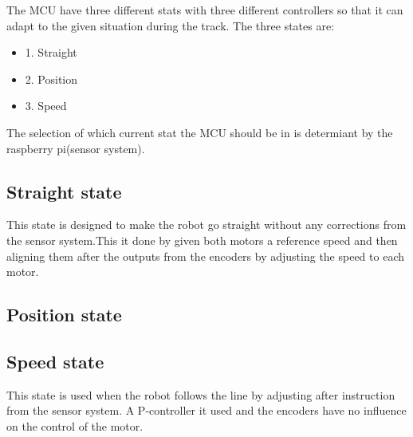 The MCU have three different stats with three different controllers so that it can adapt to the given situation during the track. The three states are:


\begin{itemize}
\item 1. Straight
\item 2. Position
\item 3. Speed
\end{itemize}

The selection of which current stat the MCU should be in is determiant by the raspberry pi(sensor system).

\subsection{Straight state}
This state is designed to make the robot go straight without any corrections from the sensor system.This it done by given both motors a reference speed and then aligning them after the outputs from the encoders by adjusting the speed to each motor. 


\subsection{Position state}


\subsection{Speed state}
This state is used when the robot follows the line by adjusting after instruction from the sensor system. A P-controller it used and the encoders have no influence on the control of the motor.
